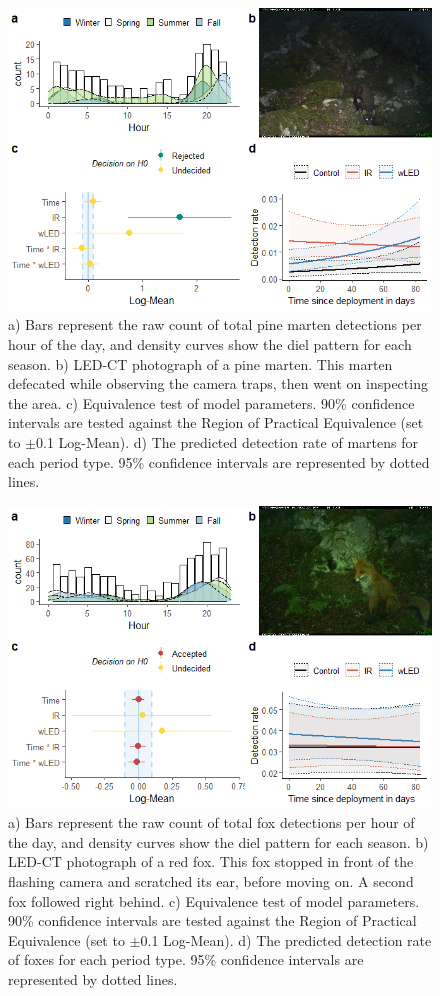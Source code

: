 \begin{figure}
	\centering
	\includegraphics[width=12cm]{../R/glmm_sp_files/figure-html/maar2-1.png}
	\caption[Pine marten]
	{\scriptsize
		a) Bars represent the raw count of total pine marten detections per hour of the day, and density curves show the diel pattern for each season.
		b) LED-CT photograph of a pine marten. This marten defecated while observing the camera traps, then went on inspecting the area.
		c) Equivalence test of model parameters. 90\% confidence intervals are tested against the Region of Practical Equivalence (set to $\pm$0.1 Log-Mean).
		d) The predicted detection rate of martens for each period type. 95\% confidence intervals are represented by dotted lines.}
	\label{maar}
\end{figure}

\begin{figure}
		  \centering
	\includegraphics[width=12cm]{../R/glmm_sp_files/figure-html/rev2-1.png}
\caption[Red fox]
{\scriptsize
	a) Bars represent the raw count of total fox detections per hour of the day, and density curves show the diel pattern for each season.
	b) LED-CT photograph of a red fox. This fox stopped in front of the flashing camera and scratched its ear, before moving on. A second fox followed right behind.
	c) Equivalence test of model parameters. 90\% confidence intervals are tested against the Region of Practical Equivalence (set to $\pm$0.1 Log-Mean).
	d) The predicted detection rate of foxes for each period type. 95\% confidence intervals are represented by dotted lines.}
\label{rev}
\end{figure}

